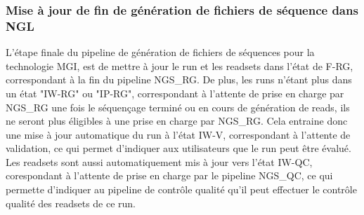 \subsubsection*{Mise à jour de fin de génération de fichiers de séquence dans NGL}
L'étape finale du pipeline de génération de fichiers de séquences pour la technologie MGI, est de mettre à jour le run et les readsets dans l'état de \og F-RG\fg{}, correspondant à la fin du pipeline NGS\_RG.
De plus, les runs n'étant plus dans un état "IW-RG" ou "IP-RG", correspondant à l'attente de prise en charge par NGS\_RG une fois le séquençage terminé ou en cours de génération de reads, ils ne seront plus éligibles à une prise en charge par NGS\_RG.
Cela entraine donc une mise à jour automatique du run à l'état \og IW-V\fg{}, correspondant à l'attente de validation, ce qui permet d'indiquer aux utilisateurs que le run peut être évalué.
Les readsets sont aussi automatiquement mis à jour vers l'état \og IW-QC\fg{}, corespondant à l'attente de prise en charge par le pipeline NGS\_QC, ce qui permette d'indiquer au pipeline de contrôle qualité qu'il peut effectuer le contrôle qualité des readsets de ce run.

